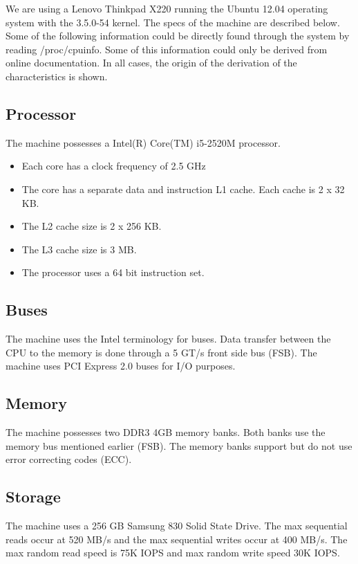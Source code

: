 We are using a Lenovo Thinkpad X220 running the Ubuntu 12.04 operating system with the 3.5.0-54 kernel. The specs of the machine are described below. Some of the following information could be directly found through the system by reading /proc/cpuinfo. Some of this information could only be derived from online documentation. In all cases, the origin of the derivation of the characteristics is shown.

\subsection{Processor}
The machine possesses a Intel(R) Core(TM) i5-2520M processor. 

\begin{itemize}
    \item{Each core has a clock frequency of 2.5 GHz}
    \item{The core has a separate data and instruction L1 cache. Each cache is 2 x 32 KB.}
\item{The L2 cache size is 2 x 256 KB.}
\item{The L3 cache size is 3 MB.}
\item{The processor uses a 64 bit instruction set.}
\end{itemize}

\subsection{Buses}

The machine uses the Intel terminology for buses. Data transfer between the CPU to the memory is done through a 5 GT/s front side bus (FSB). The machine uses PCI Express 2.0 buses for I/O purposes.

\subsection{Memory}

The machine possesses two DDR3 4GB memory banks. Both banks use the memory bus mentioned earlier (FSB). The memory banks support but do not use error correcting codes (ECC). 

\subsection{Storage}

The machine uses a 256 GB Samsung 830 Solid State Drive. The max sequential
reads occur at 520 MB/s and the max sequential writes occur at 400 MB/s. The max random read speed is 75K IOPS and max random write speed 30K IOPS. 

